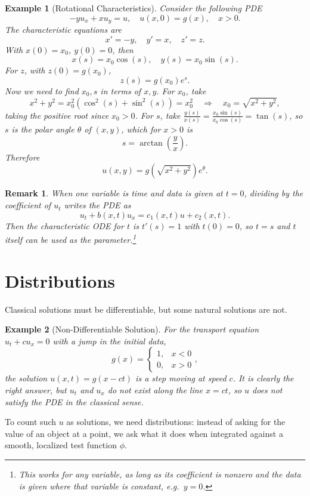 \documentclass{article}
\newtheorem*{example}{Example}
\newtheorem{remark}{Remark}
\begin{document}
\begin{example}[Rotational Characteristics]
    Consider the following PDE
    \[-yu_x+xu_y=u,\quad u(x,0)=g(x),\quad x>0.\]
    The characteristic equations are
    \[x'=-y,\quad y'=x, \quad z'=z.\]
    With $x(0)=x_0$, $y(0) = 0$, then
    \[x(s) = x_0\cos(s),\quad y(s) = x_0\sin(s).\]
    For $z$, with $z(0)=g(x_0)$,
    \[z(s)=g(x_0)e^s.\]
    Now we need to find $x_0,s$ in terms of $x,y$. For $x_0$, take
    \[x^2+y^2 = x_0^2\left(\cos^2(s)+\sin^2(s)\right) = x_0^2 \quad\Rightarrow\quad x_0=\sqrt{x^2+y^2},\]
    taking the positive root since $x_0>0$. For $s$, take $\frac{y(s)}{x(s)} = \frac{x_0\sin(s)}{x_0\cos(s)}=\tan(s)$, so $s$ is the polar angle $\theta$ of $(x,y)$, which for $x>0$ is
    \[s = \arctan\left(\frac{y}{x}\right).\]
    Therefore
    \[u(x,y) = g\left(\sqrt{x^2+y^2}\right)e^{\theta}.\]
\end{example}
\begin{remark}
    When one variable is time and data is given at $t=0$, dividing by the coefficient of $u_t$ writes the PDE as
    \[u_t+b(x,t)u_x=c_1(x,t)u+c_2(x,t).\]
    Then the characteristic ODE for $t$ is $t'(s)=1$ with $t(0)=0$, so $t=s$ and $t$ itself can be used as the parameter.\footnote{This works for any variable, as long as its coefficient is nonzero and the data is given where that variable is constant, e.g.\ $y=0$.}
\end{remark}

\section{Distributions}
Classical solutions must be differentiable, but some natural solutions are not.
\begin{example}[Non-Differentiable Solution]
    For the transport equation $u_t+cu_x=0$ with a jump in the initial data,
    \[g(x)=\begin{cases}1, & x<0\\0, & x>0\end{cases},\]
    the solution $u(x,t)=g(x-ct)$ is a step moving at speed $c$. It is clearly the right answer, but $u_t$ and $u_x$ do not exist along the line $x=ct$, so $u$ does not satisfy the PDE in the classical sense.
\end{example}
To count such $u$ as solutions, we need distributions: instead of asking for the value of an object at a point, we ask what it does when integrated against a smooth, localized test function $\phi$.
\end{document}
